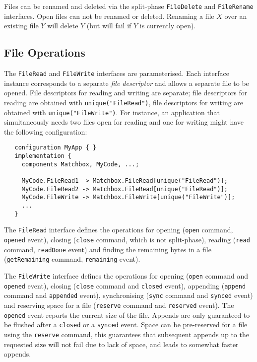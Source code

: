 \documentclass[10pt]{article}
\newcommand{\kw}[1]{\mbox{\tt #1}}
\newcommand{\code}[1]{\mbox{\tt #1}}
\begin{document}
Files can be renamed and deleted via the split-phase \kw{FileDelete} and
\kw{FileRename} interfaces. Open files can not be renamed or deleted. Renaming
a file $X$ over an existing file $Y$ will delete $Y$ (but will fail if $Y$
is currently open).

\subsection{File Operations}

The \kw{FileRead} and \kw{FileWrite} interfaces are parameterised. Each
interface instance corresponds to a separate \emph{file descriptor} and
allows a separate file to be opened. File descriptors for reading and
writing are separate; file descriptors for reading are obtained with
\code{unique("FileRead")}, file descriptors for writing are obtained with
\code{unique("FileWrite")}. For instance, an application that
simultaneously needs two files open for reading and one for writing might
have the following configuration:

\begin{verbatim}
   configuration MyApp { }
   implementation {
     components Matchbox, MyCode, ...;

     MyCode.FileRead1 -> Matchbox.FileRead[unique("FileRead")];
     MyCode.FileRead2 -> Matchbox.FileRead[unique("FileRead")];
     MyCode.FileWrite -> Matchbox.FileWrite[unique("FileWrite")];
     ...
   }
\end{verbatim}

The \kw{FileRead} interface defines the operations for opening (\kw{open}
command, \kw{opened} event), closing (\kw{close} command, which is not
split-phase), reading (\kw{read} command, \kw{readDone} event) and finding
the remaining bytes in a file (\kw{getRemaining} command, \kw{remaining}
event).

The \kw{FileWrite} interface defines the operations for opening (\kw{open}
command and \kw{opened} event), closing (\kw{close} command and \kw{closed}
event), appending (\kw{append} command and \kw{appended} event),
synchronising (\kw{sync} command and \kw{synced} event) and reserving space
for a file (\kw{reserve} command and \kw{reserved} event). The \kw{opened}
event reports the current size of the file. Appends are only guaranteed to
be flushed after a \kw{closed} or a \kw{synced} event. Space can be
pre-reserved for a file using the \kw{reserve} command, this guarantees
that subsequent appends up to the requested size will not fail due to lack
of space, and leads to somewhat faster appends.
\end{document}
